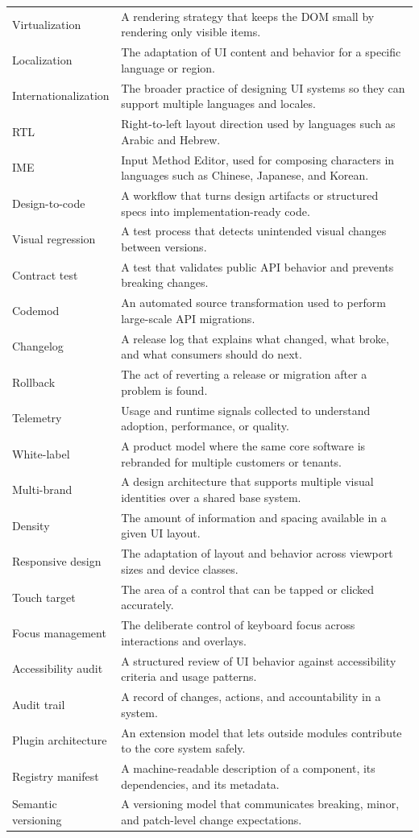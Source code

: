 \begin{longtable}{@{}p{}p{}@{}}
Virtualization & A rendering strategy that keeps the DOM small by rendering only visible items. \\
Localization & The adaptation of UI content and behavior for a specific language or region. \\
Internationalization & The broader practice of designing UI systems so they can support multiple languages and locales. \\
RTL & Right-to-left layout direction used by languages such as Arabic and Hebrew. \\
IME & Input Method Editor, used for composing characters in languages such as Chinese, Japanese, and Korean. \\
Design-to-code & A workflow that turns design artifacts or structured specs into implementation-ready code. \\
Visual regression & A test process that detects unintended visual changes between versions. \\
Contract test & A test that validates public API behavior and prevents breaking changes. \\
Codemod & An automated source transformation used to perform large-scale API migrations. \\
Changelog & A release log that explains what changed, what broke, and what consumers should do next. \\
Rollback & The act of reverting a release or migration after a problem is found. \\
Telemetry & Usage and runtime signals collected to understand adoption, performance, or quality. \\
White-label & A product model where the same core software is rebranded for multiple customers or tenants. \\
Multi-brand & A design architecture that supports multiple visual identities over a shared base system. \\
Density & The amount of information and spacing available in a given UI layout. \\
Responsive design & The adaptation of layout and behavior across viewport sizes and device classes. \\
Touch target & The area of a control that can be tapped or clicked accurately. \\
Focus management & The deliberate control of keyboard focus across interactions and overlays. \\
Accessibility audit & A structured review of UI behavior against accessibility criteria and usage patterns. \\
Audit trail & A record of changes, actions, and accountability in a system. \\
Plugin architecture & An extension model that lets outside modules contribute to the core system safely. \\
Registry manifest & A machine-readable description of a component, its dependencies, and its metadata. \\
Semantic versioning & A versioning model that communicates breaking, minor, and patch-level change expectations. \\
\end{longtable}

